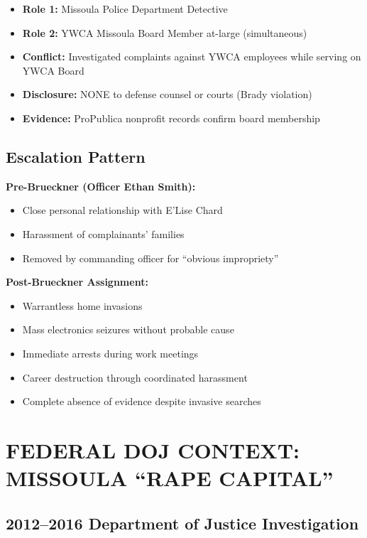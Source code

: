 \documentclass[12pt,oneside]{article}
\begin{document}
\begin{itemize}
\item \textbf{Role 1:} Missoula Police Department Detective
\item \textbf{Role 2:} YWCA Missoula Board Member at-large (simultaneous)
\item \textbf{Conflict:} Investigated complaints against YWCA employees while serving on YWCA Board
\item \textbf{Disclosure:} NONE to defense counsel or courts (Brady violation)
\item \textbf{Evidence:} ProPublica nonprofit records confirm board membership
\end{itemize}

\subsection*{Escalation Pattern}

\textbf{Pre-Brueckner (Officer Ethan Smith):}
\begin{itemize}
\item Close personal relationship with E'Lise Chard
\item Harassment of complainants' families
\item Removed by commanding officer for ``obvious impropriety''
\end{itemize}

\textbf{Post-Brueckner Assignment:}
\begin{itemize}
\item Warrantless home invasions
\item Mass electronics seizures without probable cause
\item Immediate arrests during work meetings
\item Career destruction through coordinated harassment
\item Complete absence of evidence despite invasive searches
\end{itemize}

\newpage

\section*{FEDERAL DOJ CONTEXT: MISSOULA ``RAPE CAPITAL''}

\subsection*{2012--2016 Department of Justice Investigation}
\end{document}
